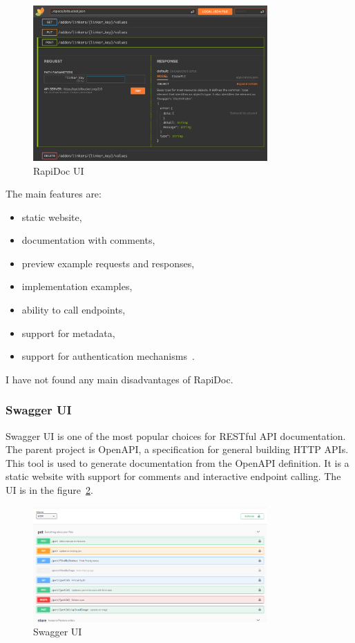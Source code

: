 \begin{figure}[hbt!]
    \centering
    \captionsetup{justification=centering}
    \includegraphics[width=0.8\textwidth]{images/rest/rapidoc}
    \caption{RapiDoc UI~\cite{rest-rapidoc}}
    \label{fig:rest-rapidoc}
\end{figure}

The main features are:
\begin{itemize}
    \item static website,
    \item documentation with comments,
    \item preview example requests and responses,
    \item implementation examples,
    \item ability to call endpoints,
    \item support for metadata,
    \item support for authentication mechanisms~\cite{rest-rapidoc}.
\end{itemize}

I have not found any main disadvantages of RapiDoc.

\subsubsection{Swagger UI}
Swagger UI is one of the most popular choices for RESTful API documentation.
The parent project is OpenAPI, a specification for general building HTTP APIs.
This tool is used to generate documentation from the OpenAPI definition.
It is a static website with support for comments and interactive endpoint calling.
The UI is in the figure~\ref{fig:rest-swagger-ui}.
\cite{rest-swagger-ui}

\begin{figure}[hbt!]
    \centering
    \captionsetup{justification=centering}
    \includegraphics[width=0.8\textwidth]{images/rest/swagger-ui}
    \caption{Swagger UI~\cite{rest-swagger-ui}}
    \label{fig:rest-swagger-ui}
\end{figure}

